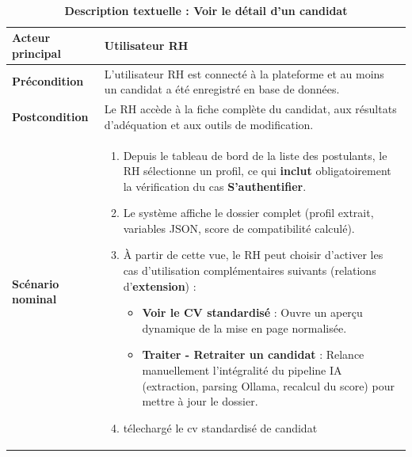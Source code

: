 \documentclass[12pt,a4paper,oneside]{report}
\begin{document}
\begin{itemize}
\begin{table}[H]
\begin{tabular}{|p{3.5cm}|p{11cm}|}
\begin{minipage}[t]{10.5cm}
\end{minipage} \\
\hline
\end{tabular}

\end{table}

\begin{table}[H]
\centering
\caption{\textbf{Description textuelle : Voir le détail d’un candidat}} \\
\vspace{0.3cm}
\begin{tabular}{|p{3.5cm}|p{11cm}|}
\hline
\textbf{Acteur principal} & Utilisateur RH \\
\hline
\textbf{Précondition} & L'utilisateur RH est connecté à la plateforme et au moins un candidat a été enregistré en base de données. \\
\hline
\textbf{Postcondition} & Le RH accède à la fiche complète du candidat, aux résultats d'adéquation et aux outils de modification. \\
\hline
\textbf{Scénario nominal} &
\begin{minipage}[t]{10.5cm}
\begin{enumerate}
    \item Depuis le tableau de bord de la liste des postulants, le RH sélectionne un profil, ce qui \textbf{inclut} obligatoirement la vérification du cas \textbf{S'authentifier}.
    \item Le système affiche le dossier complet (profil extrait, variables JSON, score de compatibilité calculé).
    \item À partir de cette vue, le RH peut choisir d'activer les cas d'utilisation complémentaires suivants (relations d'\textbf{extension}) :
        \begin{itemize}
            \item \textbf{Voir le CV standardisé} : Ouvre un aperçu dynamique de la mise en page normalisée.
            \item \textbf{Traiter - Retraiter un candidat} : Relance manuellement l'intégralité du pipeline IA (extraction, parsing Ollama, recalcul du score) pour mettre à jour le dossier.
        \end{itemize}
    \item télechargé le cv standardisé de candidat
\vspace{0.3cm}

\end{enumerate}
\end{minipage}
\end{tabular}
\end{table}
\end{itemize}
\end{document}
